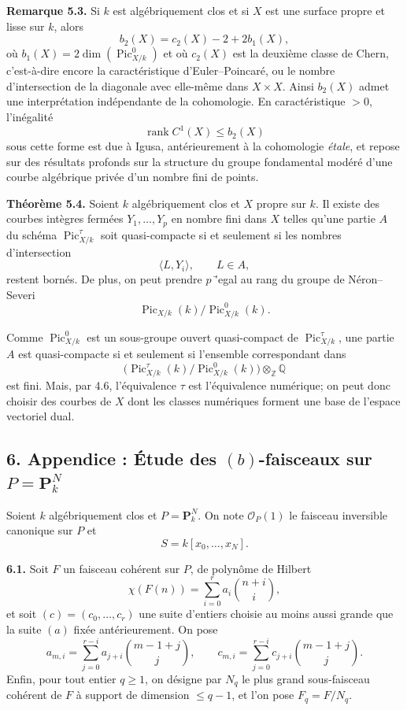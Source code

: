 \documentclass[11pt]{article}
\providecommand{\Pic}{\operatorname{Pic}}
\providecommand{\Z}{\mathbb Z}
\providecommand{\Q}{\mathbb Q}
\providecommand{\rank}{\operatorname{rank}}
\begin{document}
\textbf{Remarque 5.3.} Si $k$ est alg\'ebriquement clos et si $X$ est une surface propre et lisse sur $k$, alors
\[
   b_2(X)=c_2(X)-2+2b_1(X),
\]
o\`u $b_1(X)=2\dim(\Pic^0_{X/k})$ et o\`u $c_2(X)$ est la deuxi\`eme classe de Chern, c'est-\`a-dire encore la caract\'eristique d'Euler--Poincar\'e, ou le nombre d'intersection de la diagonale avec elle-m\^eme dans $X\times X$. Ainsi $b_2(X)$ admet une interpr\'etation ind\'ependante de la cohomologie. En caract\'eristique $>0$, l'in\'egalit\'e
\[
   \rank C^1(X)\le b_2(X)
\]
sous cette forme est due \`a Igusa, ant\'erieurement \`a la cohomologie \textit{étale}, et repose sur des r\'esultats profonds sur la structure du groupe fondamental mod\'er\'e d'une courbe alg\'ebrique priv\'ee d'un nombre fini de points.

\textbf{Th\'eor\`eme 5.4.} Soient $k$ alg\'ebriquement clos et $X$ propre sur $k$. Il existe des courbes int\`egres ferm\'ees $Y_1,\ldots,Y_p$ en nombre fini dans $X$ telles qu'une partie $A$ du sch\'ema $\Pic^\tau_{X/k}$ soit quasi-compacte si et seulement si les nombres d'intersection
\[
   \langle L,Y_i\rangle,\qquad L\in A,
\]
restent born\'es. De plus, on peut prendre $p$ \='egal au rang du groupe de N\'eron--Severi
\[
   \Pic_{X/k}(k)/\Pic^0_{X/k}(k).
\]

Comme $\Pic^0_{X/k}$ est un sous-groupe ouvert quasi-compact de $\Pic^\tau_{X/k}$, une partie $A$ est quasi-compacte si et seulement si l'ensemble correspondant dans
\[
   \bigl(\Pic^\tau_{X/k}(k)/\Pic^0_{X/k}(k)\bigr)\otimes_{\Z}\Q
\]
est fini. Mais, par 4.6, l'\'equivalence $\tau$ est l'\'equivalence num\'erique; on peut donc choisir des courbes de $X$ dont les classes num\'eriques forment une base de l'espace vectoriel dual.

\subsection*{6. Appendice : Étude des $(b)$-faisceaux sur $P=\mathbf P^N_k$}

Soient $k$ alg\'ebriquement clos et $P=\mathbf P^N_k$. On note $\mathcal O_P(1)$ le faisceau inversible canonique sur $P$ et
\[
   S=k[x_0,\ldots,x_N].
\]

\textbf{6.1.} Soit $F$ un faisceau coh\'erent sur $P$, de polyn\^ome de Hilbert
\[
   \chi(F(n))=\sum_{i=0}^{r} a_i {n+i\choose i},
\]
et soit $(c)=(c_0,\ldots,c_r)$ une suite d'entiers choisie au moins aussi grande que la suite $(a)$ fix\'ee ant\'erieurement. On pose
\[
   a_{m,i}=\sum_{j=0}^{r-i}a_{j+i}{m-1+j\choose j},
   \qquad
   c_{m,i}=\sum_{j=0}^{r-i}c_{j+i}{m-1+j\choose j}.
\]
Enfin, pour tout entier $q\ge1$, on d\'esigne par $N_q$ le plus grand sous-faisceau coh\'erent de $F$ \`a support de dimension $\le q-1$, et l'on pose $F_q=F/N_q$.
\end{document}
